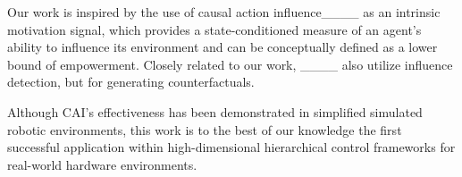 Our work is inspired by the use of causal action influence____ as an intrinsic motivation signal, which provides a state-conditioned measure of an agent’s ability to influence its environment and can be conceptually defined as a lower bound of empowerment. 
Closely related to our work, ____ also utilize influence detection, but for generating counterfactuals.

Although CAI’s effectiveness has been demonstrated in simplified simulated robotic environments, this work is to the best of our knowledge the first successful application within high-dimensional hierarchical control frameworks for real-world hardware environments.